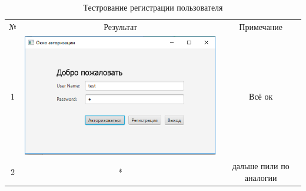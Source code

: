 \documentclass[a4paper,12pt]{article}
\begin{document}
\begin{table}[h]
	\caption{Тестрование регистрации пользователя}
	\centering
	\begin{tabular}{|c|c|c|}
	\hline 
	№  & Результат & Примечание \\ 
	1 & \includegraphics[scale=0.5]{img/database/authorization.png} & Всё ок \\
	\hline 
	2 & * & дальше пили по аналогии\\
	\hline 
\end{tabular} 
\label{table:data_type} 
\end{table}
\end{document}
